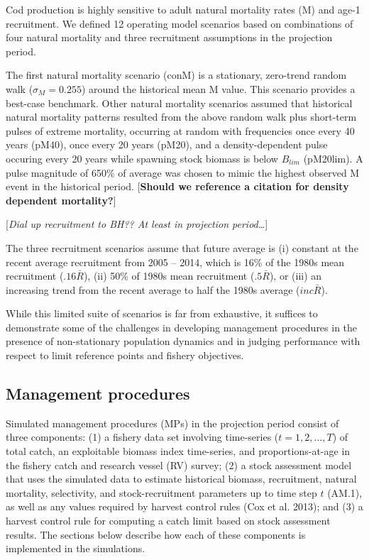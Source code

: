 \documentclass[12pt,]{article}
\begin{document}
Cod production is highly sensitive to adult natural mortality rates (M)
and age-1 recruitment. We defined 12 operating model scenarios based on
combinations of four natural mortality and three recruitment assumptions
in the projection period.

The first natural mortality scenario (conM) is a stationary, zero-trend
random walk (\(\sigma_M = 0.255\)) around the historical mean M value.
This scenario provides a best-case benchmark. Other natural mortality
scenarios assumed that historical natural mortality patterns resulted
from the above random walk plus short-term pulses of extreme mortality,
occurring at random with frequencies once every 40 years (pM40), once
every 20 years (pM20), and a density-dependent pulse occuring every 20
years while spawning stock biomass is below \(B_{lim}\) (pM20lim). A
pulse magnitude of 650\% of average was chosen to mimic the highest
observed M event in the historical period. {[}\textbf{Should we
reference a citation for density dependent mortality?}{]}

{[}\emph{Dial up recruitment to BH?? At least in projection
period\ldots{}}{]}

The three recruitment scenarios assume that future average is (i)
constant at the recent average recruitment from 2005 -- 2014, which is
16\% of the 1980s mean recruitment (\(.16\bar{R}\)), (ii) 50\% of 1980s
mean recruitment (\(.5\bar{R}\)), or (iii) an increasing trend from the
recent average to half the 1980s average (\(inc\bar{R}\)).

While this limited suite of scenarios is far from exhaustive, it
suffices to demonstrate some of the challenges in developing management
procedures in the presence of non-stationary population dynamics and in
judging performance with respect to limit reference points and fishery
objectives.

\subsection{Management procedures}\label{management-procedures}

Simulated management procedures (MPs) in the projection period consist
of three components: (1) a fishery data set involving time-series
(\(t = 1,2,\dots,T\)) of total catch, an exploitable biomass index
time-series, and proportions-at-age in the fishery catch and research
vessel (RV) survey; (2) a stock assessment model that uses the simulated
data to estimate historical biomass, recruitment, natural mortality,
selectivity, and stock-recruitment parameters up to time step \(t\)
(AM.1), as well as any values required by harvest control rules (Cox et
al. 2013); and (3) a harvest control rule for computing a catch limit
based on stock assessment results. The sections below describe how each
of these components is implemented in the simulations.
\end{document}
